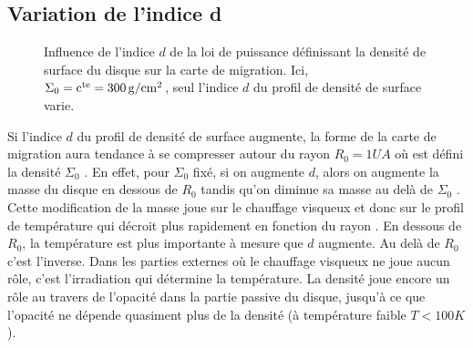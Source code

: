 \subsection{Variation de l'indice d}\label{sec:sigma_index}
\begin{figure}[htbp]
\centering
{}\hfill
{}

\hfill
{}

\caption[Influence du profil de densité sur la carte de migration.]{Influence de l'indice $d$ de la loi de puissance définissant
la densité de surface du disque sur la carte de migration.
Ici, $\Sigma_0=\mathrm{c^{te}}=300\mathrm{\thinspace g/cm^2}$, seul l'indice $d$ du profil de densité de surface varie. }\label{fig:map_index}
\end{figure}

Si l'indice $d$ du profil de densité de surface augmente, la forme de la carte de migration aura tendance à se compresser autour
du rayon $R_0=1\unit{UA}$ où est défini la densité $\Sigma_0$ . En effet, pour $\Sigma_0$ fixé, si on
augmente $d$, alors on augmente la masse du disque en dessous de $R_0$ tandis qu'on diminue sa masse au delà de $\Sigma_0$
. Cette modification de la masse joue sur le chauffage visqueux et donc sur le profil de température
qui décroit plus rapidement en fonction du rayon . En dessous de $R_0$, la température est plus
importante à mesure que $d$ augmente. Au delà de $R_0$ c'est l'inverse. Dans les parties externes où le chauffage visqueux ne
joue aucun rôle, c'est l'irradiation qui détermine la température. La densité joue encore un rôle au travers de l'opacité dans
la partie passive du disque, jusqu'à ce que l'opacité ne dépende quasiment plus de la densité (à température faible
$T<100\unit{K}$).

